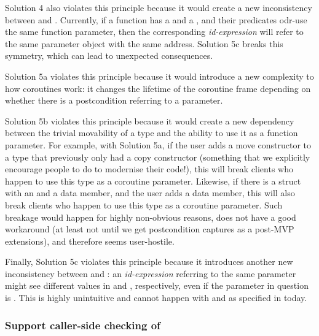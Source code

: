 Solution 4 also violates this principle because it would create a new inconsistency between  and . Currently, if a function has a  and a , and their predicates odr-use the same function parameter, then the corresponding \emph{id-expression} will refer to the same parameter object with the same address. Solution 5c breaks this symmetry, which can lead to unexpected consequences.

Solution 5a violates this principle because it would introduce a new complexity to how coroutines work: it changes the lifetime of the coroutine frame depending on whether there is a postcondition referring to a parameter.

Solution 5b violates this principle because it would create a new dependency between the trivial movability of a type and the ability to use it as a function parameter. For example, with Solution 5a, if the user adds a move constructor to a type that previously only had a copy constructor (something that we explicitly encourage people to do to modernise their code!), this will break clients who happen to use this type as a coroutine parameter. Likewise, if there is a struct with an  and a  data member, and the user adds a  data member, this will also break clients who happen to use this type as a coroutine parameter. Such breakage would happen for highly non-obvious reasons, does not have a good workaround (at least not until we get postcondition captures as a post-MVP extensions), and therefore seems user-hostile.

Finally, Solution 5c violates this principle because it introduces another new inconsistency between  and : an \emph{id-expression} referring to the same parameter might see different values in  and , respectively, even if the parameter in question is . This is highly unintuitive and cannot happen with  and  as specified in \cite{P2900R8} today.

\subsubsection{Support caller-side checking of }

